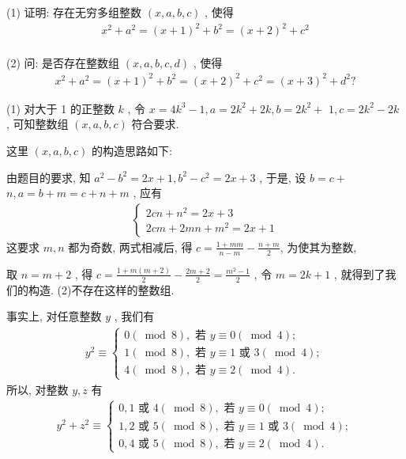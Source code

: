 \begin{example}
	(1) 证明: 存在无穷多组整数 $(x, a, b, c)$ , 使得
	\begin{align*}
		x^{2}+a^{2}=(x+1)^{2}+b^{2}=(x+2)^{2}+c^{2}
	\end{align*}\\
	(2) 问: 是否存在整数组 $(x, a, b, c, d)$ , 使得
	\begin{align*}
		x^{2}+a^{2}=(x+1)^{2}+b^{2}=(x+2)^{2}+c^{2}=(x+3)^{2}+d^{2} ?
	\end{align*}
\end{example}
\begin{solution}
	(1) 对大于 1 的正整数 $k$ , 令 $x=4 k^{3}-1, a=2 k^{2}+2 k, b=2 k^{2}+$ $1, c=2 k^{2}-2 k$ , 可知整数组 $(x, a, b, c)$ 符合要求.

	这里 $(x, a, b, c)$ 的构造思路如下:

	由题目的要求, 知 $a^{2}-b^{2}=2 x+1 ,  b^{2}-c^{2}=2 x+3$ , 于是, 设 $b=c+$ $n, a=b+m=c+n+m$ , 应有
	\begin{align*}
		\left\{\begin{array}{l}
			       2 c n+n^{2}=2 x+3 \\
			       2 c m+2 m n+m^{2}=2 x+1
		       \end{array}\right.
	\end{align*}
	这要求 $m ,  n$ 都为奇数, 两式相减后, 得 $c=\frac{1+m m}{n-m}-\frac{n+m}{2}$, 为使其为整数,

	取 $n=m+2$ , 得 $c=\frac{1+m(m+2)}{2}-\frac{2 m+2}{2}=\frac{m^{2}-1}{2}$ , 令 $m=2 k+1$ , 就得到了我们的构造.
	(2)不存在这样的整数组.

	事实上, 对任意整数 $y$ , 我们有
	\begin{align*}
		y^{2} \equiv\left\{\begin{array}{l}
			                   0(\bmod 8), \text { 若 } y \equiv 0(\bmod 4) ;                \\
			                   1(\bmod 8), \text { 若 } y \equiv 1 \text { 或 } 3(\bmod 4) ; \\
			                   4(\bmod 8), \text { 若 } y \equiv 2(\bmod 4) .
		                   \end{array}\right.
	\end{align*}
	所以, 对整数 $y ,  z$ 有
	\begin{align*}
		y^{2}+z^{2} \equiv\left\{\begin{array}{l}
			                         0,1 \text { 或 } 4(\bmod 8), \text { 若 } y \equiv 0(\bmod 4) ;                  \\
			                         1,2 \text { 或 } 5(\bmod 8) ,  \text { 若 } y \equiv 1 \text { 或 } 3(\bmod 4) ; \\
			                         0,4 \text { 或 } 5(\bmod 8) ,  \text { 若 } y \equiv 2(\bmod 4) .
		                         \end{array}\right.
	\end{align*}


\end{solution}
